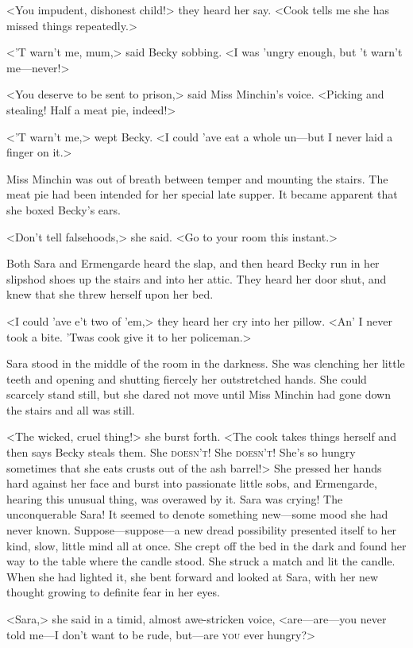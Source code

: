 <You impudent, dishonest child!> they heard her say. <Cook tells me she has missed things repeatedly.>

<'T warn't me, mum,> said Becky sobbing. <I was 'ungry enough, but 't warn't me—never!>

<You deserve to be sent to prison,> said Miss Minchin's voice. <Picking and stealing! Half a meat pie, indeed!>

<'T warn't me,> wept Becky. <I could 'ave eat a whole un—but I never laid a finger on it.>

Miss Minchin was out of breath between temper and mounting the stairs. The meat pie had been intended for her special late supper. It became apparent that she boxed Becky's ears.

<Don't tell falsehoods,> she said. <Go to your room this instant.>

Both Sara and Ermengarde heard the slap, and then heard Becky run in her slipshod shoes up the stairs and into her attic. They heard her door shut, and knew that she threw herself upon her bed.

<I could 'ave e't two of 'em,> they heard her cry into her pillow. <An' I never took a bite. 'Twas cook give it to her policeman.>

Sara stood in the middle of the room in the darkness. She was clenching her little teeth and opening and shutting fiercely her outstretched hands. She could scarcely stand still, but she dared not move until Miss Minchin had gone down the stairs and all was still.

<The wicked, cruel thing!> she burst forth. <The cook takes things herself and then says Becky steals them. She \textsc{doesn't}! She \textsc{doesn't}! She's so hungry sometimes that she eats crusts out of the ash barrel!> She pressed her hands hard against her face and burst into passionate little sobs, and Ermengarde, hearing this unusual thing, was overawed by it. Sara was crying! The unconquerable Sara! It seemed to denote something new—some mood she had never known. Suppose—suppose—a new dread possibility presented itself to her kind, slow, little mind all at once. She crept off the bed in the dark and found her way to the table where the candle stood. She struck a match and lit the candle. When she had lighted it, she bent forward and looked at Sara, with her new thought growing to definite fear in her eyes.

<Sara,> she said in a timid, almost awe-stricken voice, <are—are—you never told me—I don't want to be rude, but—are \textsc{you} ever hungry?>

